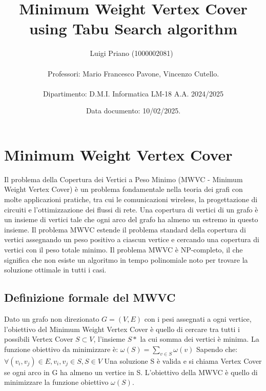 \documentclass[12pt,a4paper,twoside]{article}
\title{Minimum Weight Vertex Cover using Tabu Search algorithm}
\newcommand{\studentname}{Luigi Priano (1000002081)}
\newcommand{\tutor}{Mario Francesco Pavone, Vincenzo Cutello}
\newcommand{\reportdate}{10/02/2025}
\newcommand{\department}{D.M.I. Informatica LM-18 A.A. 2024/2025}
\begin{document}
\setlength{\parindent}{0em}
\setlength{\parskip}{0.5em}
\author{\studentname ~ \\ \\ Professori: \tutor.\\
\\
Dipartimento: \department}

\date{Data documento: \reportdate.}

\renewcommand\abstractname{Summary}

\pagestyle{fancy}
\fancyhead{}
\fancyhead[C]{\studentname~}
\fancyfoot{}
\fancyfoot[C]{\thepage}
\renewcommand{\headrulewidth}{0pt}
\renewcommand{\footrulewidth}{0pt}

\renewcommand\bibname{Riferimenti}
\renewcommand*\contentsname{Indice}
\renewcommand{\figurename}{Fig.}
\renewcommand{\tablename}{Tab.}

\begin{figure}[h!]
    \centering
    \maketitle
\end{figure}
\clearpage
\tableofcontents
\clearpage

\section{Minimum Weight Vertex Cover}
Il problema della Copertura dei Vertici a Peso Minimo (MWVC - Minimum Weight Vertex Cover) è un problema fondamentale nella teoria dei grafi con molte applicazioni pratiche, tra cui le comunicazioni wireless, la progettazione di circuiti e l'ottimizzazione dei flussi di rete. 
Una copertura di vertici di un grafo è un insieme di vertici tale che ogni arco del grafo ha almeno un estremo in questo insieme. Il problema MWVC estende il problema standard della copertura di vertici assegnando un peso positivo a ciascun vertice e cercando una copertura di vertici con il peso totale minimo. Il problema MWVC è NP-completo, il che significa che non esiste un algoritmo in tempo polinomiale noto per trovare la soluzione ottimale in tutti i casi.
\subsection{Definizione formale del MWVC}
Dato un grafo non direzionato $G = (V,E)$ con i pesi assegnati a ogni vertice, l'obiettivo del Minimum Weight Vertex Cover è quello di cercare tra tutti i possibili Vertex Cover $S \subset V$, l'insieme $S*$ la cui somma dei vertici è minima. \newline
La funzione obiettivo da minimizzare è: $\omega(S) = \sum_{v\in S}\omega(v)$ \newline Sapendo che: $\forall (v_i,v_j) \in E, v_i,v_j \in S, S \in V$
\newline
Una soluzione S è valida e si chiama Vertex Cover se ogni arco in G ha almeno un vertice in S. L'obiettivo della MWVC è quello di minimizzare la funzione obiettivo $\omega(S)$.
\end{document}
